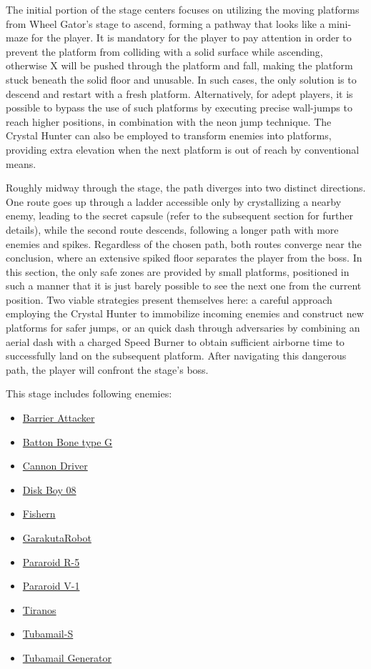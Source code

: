 The initial portion of the stage centers focuses on utilizing the moving platforms from Wheel Gator's stage to ascend, forming a pathway that looks like a mini-maze for the player. It is mandatory for the player to pay attention in order to prevent the platform from colliding with a solid surface while ascending, otherwise X will be pushed through the platform and fall, making the platform stuck beneath the solid floor and  unusable. In such cases, the only solution is to descend and restart with a fresh platform. Alternatively, for adept players, it is possible to bypass the use of such platforms by executing precise wall-jumps to reach higher positions, in combination with the neon jump technique. The Crystal Hunter can also be employed to transform enemies into platforms, providing extra elevation when the next platform is out of reach by conventional means.

Roughly midway through the stage, the path diverges into two distinct directions. One route goes up through a ladder accessible only by crystallizing a nearby enemy, leading to the secret capsule (refer to the subsequent section for further details), while the second route descends, following a longer path with more enemies and spikes. Regardless of the chosen path, both routes converge near the conclusion, where an extensive spiked floor separates the player from the boss. In this section, the only safe zones are provided by small platforms, positioned in such a manner that it is just barely possible to see the next one from the current position. Two viable strategies present themselves here: a careful approach employing the Crystal Hunter to immobilize incoming enemies and construct new platforms for safer jumps, or an quick dash through adversaries by combining an aerial dash with a charged Speed Burner to obtain sufficient airborne time to successfully land on the subsequent platform. After navigating this dangerous path, the player will confront the stage's boss.

This stage includes following enemies:
\begin{itemize}
	\item \hyperlink{enem:Barrier_Attacker}{Barrier Attacker}
	\item \hyperlink{enem:Batton_Bone_type_G}{Batton Bone type G}
	\item \hyperlink{enem:Cannon_Driver}{Cannon Driver}
	\item \hyperlink{enem:Disk_Boy_08}{Disk Boy 08}
	\item \hyperlink{enem:Fishern}{Fishern}
	\item \hyperlink{enem:Garakuta_Robot}{GarakutaRobot}
	\item \hyperlink{enem:Pararoid_R-5}{Pararoid R-5}
	\item \hyperlink{enem:Pararoid_V-1}{Pararoid V-1}
	\item \hyperlink{enem:Tiranos}{Tiranos}
	\item \hyperlink{enem:Tubamail-S}{Tubamail-S}
	\item \hyperlink{enem:Tubamail_Generator}{Tubamail Generator}
\end{itemize}


